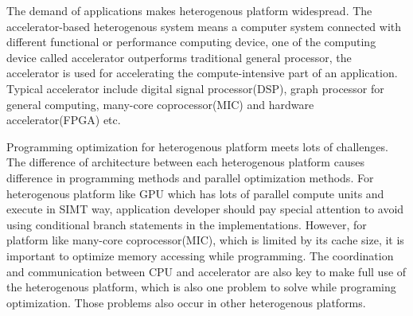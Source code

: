 \begin{eabstract}
The demand of applications makes heterogenous platform widespread. The accelerator-based heterogenous system means a computer system connected with different functional or performance computing device, one of the computing device called accelerator outperforms traditional general processor, the accelerator is used for accelerating the compute-intensive part of an application. Typical accelerator include digital signal processor(DSP), graph processor for general computing, many-core coprocessor(MIC) and hardware accelerator(FPGA) etc.

Programming optimization for heterogenous platform meets lots of challenges. The difference of architecture between each heterogenous platform causes difference in programming methods and parallel optimization methods. For heterogenous platform like GPU which has lots of parallel compute units and execute in SIMT way, application developer should pay special attention to avoid using conditional branch statements in the implementations. However, for platform like many-core coprocessor(MIC), which is limited by its cache size, it is important to optimize memory accessing while programming. The coordination and communication between CPU and accelerator are also key to make full use of the heterogenous platform, which is also one problem to solve while programing optimization. Those problems also occur in other heterogenous platforms. 


\end{eabstract}
